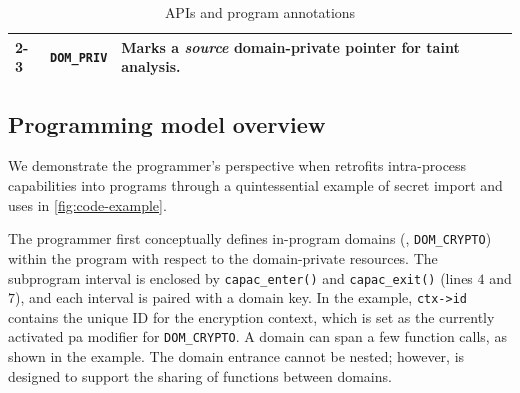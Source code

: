 \begin{table}[t]
\begin{tabularx}{.98\textwidth}{lXX}
		\cline{2-3}
		                                                                       & \texttt{DOM\_PRIV}                                              & Marks a \emph{source} domain-private pointer for taint analysis.                           \\
		\bottomrule
	\end{tabularx}
	\caption{\thename APIs and program annotations}\label{tab:apis}
\end{table}




\subsection{Programming model overview}
\label{sec:enforcement}
\label{sec:implementation}

\label{sec:design:prog-model}


We demonstrate the programmer's perspective when retrofits intra-process capabilities into programs through a quintessential example of secret import and uses in \autoref{fig:code-example}.



The programmer first conceptually defines in-program domains (\eg, \texttt{DOM\_CRYPTO}) within the program with respect to the domain-private resources.
The subprogram interval is enclosed by \texttt{capac\_enter()} and \texttt{capac\_exit()} (lines $4$ and  $7$), and each interval is paired with a domain key.
In the example, \texttt{ctx->id} contains the unique ID for the encryption context, which is set as the currently activated \gls{pa} modifier for \texttt{DOM\_CRYPTO}.
A domain can span a few function calls, as shown in the example.
The domain entrance cannot be nested; however, \thename is designed to support the sharing of functions between domains.


